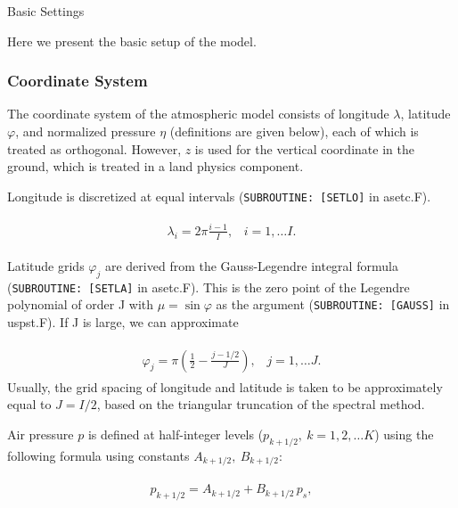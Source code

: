 Basic Settings

Here we present the basic setup of the model.

\hypertarget{coordinate-system}{%
\subsubsection{Coordinate System}\label{coordinate-system}}

The coordinate system of the atmospheric model consists of longitude \(\lambda\), latitude \(\varphi\), and normalized pressure \(\eta\) (definitions are given below), each of which is treated as
orthogonal. However, \(z\) is used for the vertical coordinate in the ground, which is treated in a land physics component.

Longitude is discretized at equal intervals (\texttt{SUBROUTINE:~{[}SETLO{]}} in asetc.F).

\begin{eqnarray}
\begin{aligned}
\lambda_i = 2 \pi \frac{i-1}{I},  \;\;\; i = 1, \ldots I.\end{aligned}
\end{eqnarray}

Latitude grids \(\varphi_j\) are derived from the Gauss-Legendre integral formula (\texttt{SUBROUTINE:~{[}SETLA{]}} in asetc.F). This is the zero point of the Legendre polynomial of order J with
\(\mu = \sin \varphi\) as the argument (\texttt{SUBROUTINE:~{[}GAUSS{]}} in uspst.F). If J is large, we can approximate

\begin{eqnarray}
\begin{aligned}
\varphi_j =  \pi \left( \frac{1}{2}- \frac{j-1/2}{J} \right), \;\;\; j = 1, \ldots J.\end{aligned}
\end{eqnarray} Usually, the grid spacing of longitude and latitude is taken to be approximately equal to \(J = I/2\), based on the triangular truncation of the spectral method.

Air pressure \(p\) is defined at half-integer levels (\(p_{k+1/2},\ k = 1, 2, \ldots K\)) using the following formula using constants \(A_{k+1/2},\ B_{k+1/2}\):

\begin{eqnarray}
\begin{aligned}
p_{k+1/2} = A_{k+1/2} +B_{k+1/2}\,p_s,\end{aligned}
\end{eqnarray}

